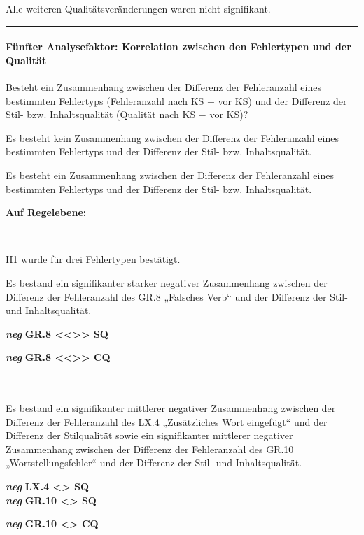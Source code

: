 \medskip
\noindent
\parbox[t]{.75\textwidth}{
Alle weiteren Qualitätsveränderungen waren nicht signifikant.
}
\smallskip
\hrule
\paragraph*{Fünfter Analysefaktor: Korrelation zwischen den Fehlertypen und der Qualität}
\begin{description}[font=\normalfont\bfseries]
\item [Fragestellung:] Besteht ein Zusammenhang zwischen der Differenz der Fehleranzahl eines bestimmten Fehlertyps (Fehleranzahl nach KS $-$ vor KS) und der Differenz der Stil- bzw. Inhaltsqualität (Qualität nach KS $-$ vor KS)?
\item [H0 --] Es besteht kein Zusammenhang zwischen der Differenz der Fehleranzahl eines bestimmten Fehlertyps und der Differenz der Stil- bzw. Inhaltsqualität.
\item [H1 --] Es besteht ein Zusammenhang zwischen der Differenz der Fehleranzahl eines bestimmten Fehlertyps und der Differenz der Stil- bzw. Inhaltsqualität.
\item [Resultat]
\end{description}
\noindent
\parbox[t]{.7\textwidth}{\textbf{Auf Regelebene:}}\\
\parbox[t]{.7\textwidth}{
H1 wurde für drei Fehlertypen bestätigt.

Es bestand ein signifikanter starker negativer Zusammenhang zwischen der Differenz der Fehleranzahl des GR.8 „Falsches Verb“ und der Differenz der Stil- und Inhaltsqualität.
}
\parbox[t]{.04\textwidth}{}
\colorbox{smGreen}{\parbox[t]{.25\textwidth}{
{ \textbf{\textit{neg}} \textbf{GR.8 <{}<{}>{}> SQ}}

 \textbf{\textit{neg}} \textbf{GR.8 <{}<{}>{}> CQ}\\
 \\
 \\
}}

\medskip
\noindent
\parbox[t]{.7\textwidth}{
Es bestand ein signifikanter mittlerer negativer Zusammenhang zwischen der Differenz der Fehleranzahl des LX.4 „Zusätzliches Wort eingefügt“ und der Differenz der Stilqualität
sowie ein signifikanter mittlerer negativer Zusammenhang zwischen der Differenz der Fehleranzahl des GR.10 „Wortstellungsfehler“ und der Differenz der Stil- und Inhaltsqualität.
}
\parbox[t]{.04\textwidth}{}
\colorbox{smGreen}{\parbox[t]{.25\textwidth}{
{ \textbf{\textit{neg}} \textbf{LX.4 <> SQ}}\\

{ \textbf{\textit{neg}} \textbf{GR.10 <> SQ}}

 \textbf{\textit{neg}} \textbf{GR.10 <> CQ}\\
 \\
 \\
}}

